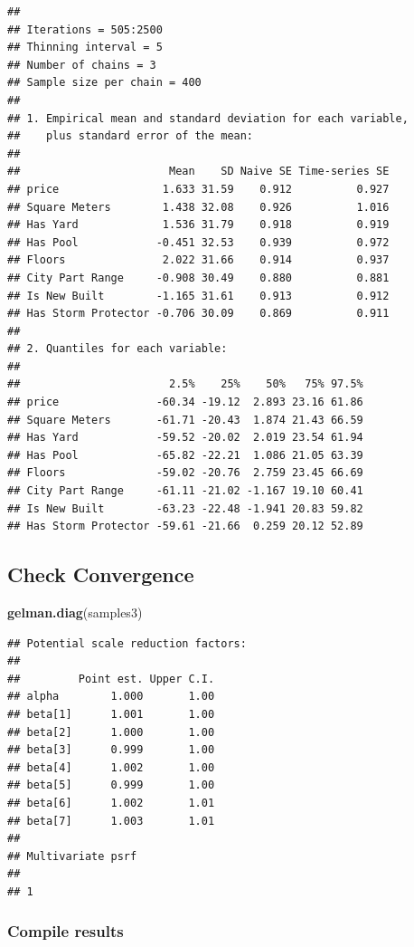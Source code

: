 \documentclass[
]{article}
\newenvironment{Shaded}{\begin{snugshade}}{\end{snugshade}}
\newcommand{\FunctionTok}[1]{\textcolor[rgb]{0.13,0.29,0.53}{\textbf{#1}}}
\newcommand{\NormalTok}[1]{#1}
\begin{document}
\begin{verbatim}
## 
## Iterations = 505:2500
## Thinning interval = 5 
## Number of chains = 3 
## Sample size per chain = 400 
## 
## 1. Empirical mean and standard deviation for each variable,
##    plus standard error of the mean:
## 
##                       Mean    SD Naive SE Time-series SE
## price                1.633 31.59    0.912          0.927
## Square Meters        1.438 32.08    0.926          1.016
## Has Yard             1.536 31.79    0.918          0.919
## Has Pool            -0.451 32.53    0.939          0.972
## Floors               2.022 31.66    0.914          0.937
## City Part Range     -0.908 30.49    0.880          0.881
## Is New Built        -1.165 31.61    0.913          0.912
## Has Storm Protector -0.706 30.09    0.869          0.911
## 
## 2. Quantiles for each variable:
## 
##                       2.5%    25%    50%   75% 97.5%
## price               -60.34 -19.12  2.893 23.16 61.86
## Square Meters       -61.71 -20.43  1.874 21.43 66.59
## Has Yard            -59.52 -20.02  2.019 23.54 61.94
## Has Pool            -65.82 -22.21  1.086 21.05 63.39
## Floors              -59.02 -20.76  2.759 23.45 66.69
## City Part Range     -61.11 -21.02 -1.167 19.10 60.41
## Is New Built        -63.23 -22.48 -1.941 20.83 59.82
## Has Storm Protector -59.61 -21.66  0.259 20.12 52.89
\end{verbatim}

\subsection{Check Convergence}\label{check-convergence-2}

\begin{Shaded}
\begin{Highlighting}[]
\FunctionTok{gelman.diag}\NormalTok{(samples3)}
\end{Highlighting}
\end{Shaded}

\begin{verbatim}
## Potential scale reduction factors:
## 
##         Point est. Upper C.I.
## alpha        1.000       1.00
## beta[1]      1.001       1.00
## beta[2]      1.000       1.00
## beta[3]      0.999       1.00
## beta[4]      1.002       1.00
## beta[5]      0.999       1.00
## beta[6]      1.002       1.01
## beta[7]      1.003       1.01
## 
## Multivariate psrf
## 
## 1
\end{verbatim}

\subsubsection{Compile results}\label{compile-results-2}
\end{document}
